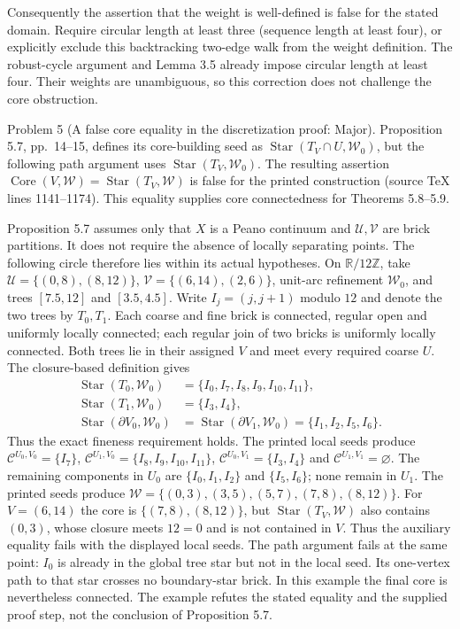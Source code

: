 \documentclass[10pt]{article}
\begin{document}
Consequently the assertion that the weight is well-defined is false for the stated domain. Require circular length at least three (sequence length at least four), or explicitly exclude this backtracking two-edge walk from the weight definition. The robust-cycle argument and Lemma 3.5 already impose circular length at least four. Their weights are unambiguous, so this correction does not challenge the core obstruction.\par
Problem 5 (A false core equality in the discretization proof: Major).  Proposition 5.7, pp. 14–15, defines its core-building seed as \(\operatorname{Star}(T_V\cap U,\mathcal W_0)\), but the following path argument uses \(\operatorname{Star}(T_V,\mathcal W_0)\). The resulting assertion \(\operatorname{Core}(V,\mathcal W)=\operatorname{Star}(T_V,\mathcal W)\) is false for the printed construction (source TeX lines 1141–1174). This equality supplies core connectedness for Theorems 5.8–5.9.\par
Proposition 5.7 assumes only that \(X\) is a Peano continuum and \(\mathcal U,\mathcal V\) are brick partitions. It does not require the absence of locally separating points. The following circle therefore lies within its actual hypotheses. On \(\mathbb R/12\mathbb Z\), take \(\mathcal U=\{(0,8),(8,12)\}\), \(\mathcal V=\{(6,14),(2,6)\}\), unit-arc refinement \(\mathcal W_0\), and trees \([7.5,12]\) and \([3.5,4.5]\). Write \(I_j=(j,j+1)\) modulo \(12\) and denote the two trees by \(T_0,T_1\). Each coarse and fine brick is connected, regular open and uniformly locally connected; each regular join of two bricks is uniformly locally connected. Both trees lie in their assigned \(V\) and meet every required coarse \(U\). The closure-based definition gives \[\begin{aligned}
 \operatorname{Star}(T_0,\mathcal W_0)&=\{I_0,I_7,I_8,I_9,I_{10},I_{11}\},\\
 \operatorname{Star}(T_1,\mathcal W_0)&=\{I_3,I_4\},\\
 \operatorname{Star}(\partial V_0,\mathcal W_0)
   &=\operatorname{Star}(\partial V_1,\mathcal W_0)=\{I_1,I_2,I_5,I_6\}.
\end{aligned}\] Thus the exact fineness requirement holds. The printed local seeds produce \(\mathcal C^{U_0,V_0}=\{I_7\}\), \(\mathcal C^{U_1,V_0}=\{I_8,I_9,I_{10},I_{11}\}\), \(\mathcal C^{U_0,V_1}=\{I_3,I_4\}\) and \(\mathcal C^{U_1,V_1}=\varnothing\). The remaining components in \(U_0\) are \(\{I_0,I_1,I_2\}\) and \(\{I_5,I_6\}\); none remain in \(U_1\). The printed seeds produce \(\mathcal W=\{(0,3),(3,5),(5,7),(7,8),(8,12)\}\). For \(V=(6,14)\) the core is \(\{(7,8),(8,12)\}\), but \(\operatorname{Star}(T_V,\mathcal W)\) also contains \((0,3)\), whose closure meets \(12=0\) and is not contained in \(V\). Thus the auxiliary equality fails with the displayed local seeds. The path argument fails at the same point: \(I_0\) is already in the global tree star but not in the local seed. Its one-vertex path to that star crosses no boundary-star brick. In this example the final core is nevertheless connected. The example refutes the stated equality and the supplied proof step, not the conclusion of Proposition 5.7.\par
\end{document}
